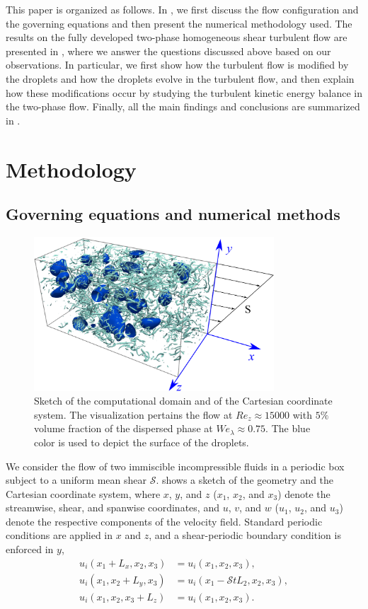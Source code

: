 This paper is organized as follows. In , we first discuss the flow configuration and the governing equations and then present the numerical methodology used. The results on the fully developed two-phase homogeneous shear turbulent flow are presented in , where we answer the questions discussed above based on our observations. In particular, we first show how the turbulent flow is modified by the droplets and how the droplets evolve in the turbulent flow, and then explain how these modifications occur by studying the turbulent kinetic energy balance in the two-phase flow. Finally, all the main findings and conclusions are summarized in .

\section{Methodology} \label{sec:formulation}
\subsection{Governing equations and numerical methods}
\begin{figure}
	\centering
	\includegraphics[width=0.8\textwidth]{fig1}
	\caption{Sketch of the computational domain and of the Cartesian coordinate system. The visualization pertains the flow at $Re_z\approx 15000$ with $5\%$ volume fraction of the dispersed phase at $We_\lambda \approx 0.75$. The blue color is used to depict the surface of the droplets.}
	\label{fig:sketch}
\end{figure}
We consider the flow of two immiscible incompressible fluids in a periodic box subject to a uniform mean shear $\mathcal{S}$.  shows a sketch of the geometry and the Cartesian coordinate system, where $x$, $y$, and $z$ ($x_1$, $x_2$, and $x_3$) denote the streamwise, shear, and spanwise coordinates, and $u$, $v$, and $w$ ($u_1$, $u_2$, and $u_3$) denote the respective components of the velocity field. Standard periodic conditions are applied in $x$ and $z$, and a shear-periodic boundary condition is enforced in $y$, \ie
\begin{align}
u_i \left( x_1+L_x, x_2, x_3 \right) &= u_i \left( x_1, x_2, x_3 \right), \\
u_i \left( x_1, x_2+L_y, x_3 \right) &= u_i \left( x_1-\mathcal{S}tL_2, x_2, x_3 \right), \\
u_i \left( x_1, x_2, x_3+L_z \right) &= u_i \left( x_1, x_2, x_3 \right). 
\end{align}

